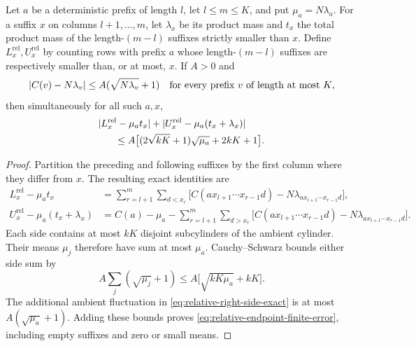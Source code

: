 \begin{lemma}
\label{lem:finite-relative-endpoints}
Let \(a\) be a deterministic prefix of length \(l\), let
\(l\le m\le K\), and put \(\mu_a=N\lambda_a\).
For a suffix \(x\) on columns \(l+1,\ldots,m\), let
\(\lambda_x\) be its product mass and \(t_x\) the total product
mass of the length-\((m-l)\) suffixes strictly smaller than \(x\).
Define \(L_x^{\mathrm{rel}},U_x^{\mathrm{rel}}\) by counting rows
with prefix \(a\) whose length-\((m-l)\) suffixes are respectively
smaller than, or at most, \(x\).
If \(A>0\) and
\[
 |C(v)-N\lambda_v|\le A(\sqrt{N\lambda_v}+1)
 \quad\hbox{for every prefix \(v\) of length at most \(K\)},
\]
then simultaneously for all such \(a,x\),
\begin{equation}
\label{eq:relative-endpoint-finite-error}
\begin{split}
 &|L_x^{\mathrm{rel}}-\mu_at_x|
  +|U_x^{\mathrm{rel}}-\mu_a(t_x+\lambda_x)|\\
 &\hspace{6mm}\le
 A\bigl[(2\sqrt{kK}+1)\sqrt{\mu_a}+2kK+1\bigr].
\end{split}
\end{equation}
\end{lemma}

\begin{proof}
Partition the preceding and following suffixes by the first column
where they differ from \(x\).  The resulting exact identities are
\begin{align}
\label{eq:relative-left-side-exact}
 L_x^{\mathrm{rel}}-\mu_at_x
 &=\sum_{r=l+1}^m\sum_{d<x_r}
   \bigl[C(ax_{l+1}\cdots x_{r-1}d)
          -N\lambda_{ax_{l+1}\cdots x_{r-1}d}\bigr],\\
\label{eq:relative-right-side-exact}
 U_x^{\mathrm{rel}}-\mu_a(t_x+\lambda_x)
 &=C(a)-\mu_a
  -\sum_{r=l+1}^m\sum_{d>x_r}
   \bigl[C(ax_{l+1}\cdots x_{r-1}d)
          -N\lambda_{ax_{l+1}\cdots x_{r-1}d}\bigr].
\end{align}
Each side contains at most \(kK\) disjoint subcylinders of the
ambient cylinder.  Their means \(\mu_j\) therefore have sum at
most \(\mu_a\).  Cauchy--Schwarz bounds either side sum by
\[
 A\sum_j(\sqrt{\mu_j}+1)
 \le A\bigl[\sqrt{kK\mu_a}+kK\bigr].
\]
The additional ambient fluctuation in
\eqref{eq:relative-right-side-exact} is at most
\(A(\sqrt{\mu_a}+1)\).  Adding these bounds proves
\eqref{eq:relative-endpoint-finite-error}, including empty suffixes
and zero or small means.
\end{proof}

